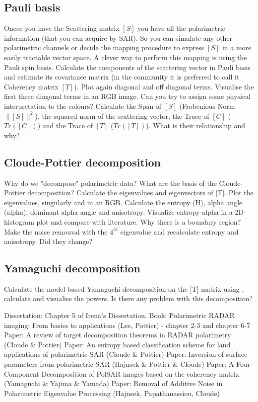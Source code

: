 \subsection{Pauli basis}
Onece you have the Scattering matrix $[S]$ you have all the polarimetric information (that you can acquire by SAR). So you can simulate any other polarimetric channels or decide the mapping procedure to express $[S]$ in a more easily tractable vector space. A clever way to perform this mapping is using the Pauli spin basis. Calculate the components of the scattering vector in Pauli basis and estimate its covariance matrix (in the community it is preferred to call it Coherency matrix $[T]$). Plot again diagonal and off diagonal terms. Visualise the first three diagonal terms in an RGB image. Can you try to assign some physical interpretation to the colours? Calculate the Span of $[S]$ (Frobenious Norm $\|[S]\|^2$), the squared norm of the scattering vector, the Trace of $[C]$ ($Tr([C])$) and the Trace of $[T]$ ($Tr([T])$). What is their relationship and why?

\subsection{Cloude-Pottier decomposition}
Why do we "decompose" polarimetric data? What are the basis of the Cloude-Pottier decomposition? Calculate the eigenvalues and eigenvectors of [T]. Plot the eigenvalues, singularly and in an RGB. Calculate the entropy (H), alpha angle (alpha), dominant alpha angle and anisotropy. Visualize entropy-alpha in a 2D-histogram plot and compare with literature. Why there is a boundary region? Make the noise remouval with the $4^{th}$ eigenvalue and recalculate entropy and anisotropy. Did they change?

\subsection{Yamaguchi decomposition}

Calculate the model-based Yamaguchi decomposition on the [T]-matrix using \cite{YamaguchiP}, calculate and visualise the powers. Is there any problem with this decomposition?

\begin{thebibliography}{123}
 Dissertation: Chapter 5 of Irena's Dissertation.
 Book: Polarimetric RADAR imaging: From basics to applications (Lee, Pottier) - chapter 2-3 and chapter 6-7
 Paper: A review of target decomposition theorems in RADAR polarimetry (Cloude \& Pottier)
 Paper: An entropy based classification scheme for land applications of polarimetric SAR (Cloude \& Pottier)
 Paper: Inversion of surface parameters from polarimetric SAR (Hajnsek \& Pottier \& Cloude)
 Paper: A Four-Component Decomposition of PolSAR images based on the coherency matrix (Yamaguchi \& Yajima \& Yamada)
 Paper: Removal of Additive Noise in Polarimetric Eigenvalue Processing (Hajnsek, Papathanassiou, Cloude)
\end{thebibliography}
